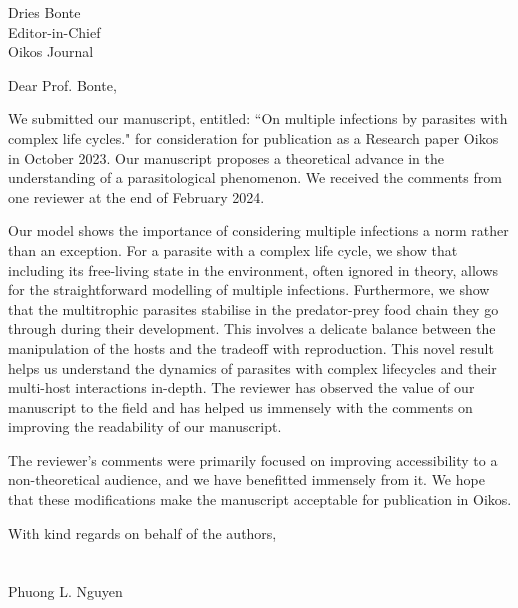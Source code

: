 \documentclass[10,DIN, pagenumber=false, parskip=half,fromalign=right, fromphone=false,fromemail=true, fromurl=false,fromlogo=true, fromrule=false]{scrlttr2}
\begin{document}
\sffamily

\begin{letter}{
\sffamily
\vspace{-0.4cm}
Dries Bonte \\
Editor-in-Chief\\
Oikos Journal
}
\opening{\sffamily \vspace{-1cm} Dear Prof. Bonte,}
\vspace{-0.3cm}

We submitted our manuscript, entitled: ``On multiple infections by parasites with complex life cycles." for consideration for publication as a Research paper Oikos in October 2023.
Our manuscript proposes a theoretical advance in the understanding of a parasitological phenomenon.
We received the comments from one reviewer at the end of February 2024.

Our model shows the importance of considering multiple infections a norm rather than an exception. 
For a parasite with a complex life cycle, we show that including its free-living state in the environment, often ignored in theory, allows for the straightforward modelling of multiple infections.
Furthermore, we show that the multitrophic parasites stabilise in the predator-prey food chain they go through during their development.
This involves a delicate balance between the manipulation of the hosts and the tradeoff with reproduction.
This novel result helps us understand the dynamics of parasites with complex lifecycles and their multi-host interactions in-depth. 
The reviewer has observed the value of our manuscript to the field and has helped us immensely with the comments on improving the readability of our manuscript.

The reviewer's comments were primarily focused on improving accessibility to a non-theoretical audience, and we have benefitted immensely from it.
We hope that these modifications make the manuscript acceptable for publication in Oikos.

With kind regards on behalf of the authors,\\
\\
\\
Phuong L. Nguyen

\end{letter}
\end{document}

